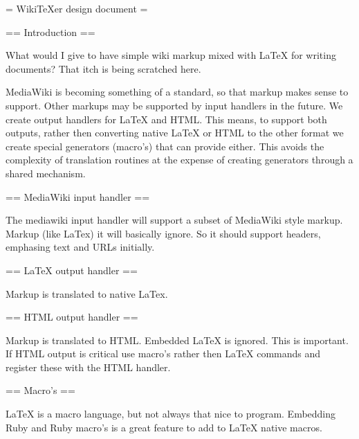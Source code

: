 = WikiTeXer design document =

== Introduction ==

What would I give to have simple wiki markup mixed with LaTeX for
writing documents? That itch is being scratched here.

MediaWiki is becoming something of a standard, so that markup makes
sense to support. Other markups may be supported by input handlers in
the future. We create output handlers for LaTeX and HTML. This means,
to support both outputs, rather then converting native LaTeX or HTML
to the other format we create special generators (macro's) that can
provide either. This avoids the complexity of translation routines at the
expense of creating generators through a shared mechanism.


== MediaWiki input handler ==

The mediawiki input handler will support a subset of MediaWiki style 
markup. Markup (like LaTex) it will basically ignore. So it should
support headers, emphasing text and URLs initially.


== LaTeX output handler ==

Markup is translated to native LaTex.


== HTML output handler ==

Markup is translated to HTML. Embedded LaTeX is ignored. This is
important. If HTML output is critical use macro's rather then LaTeX
commands and register these with the HTML handler.


== Macro's ==

LaTeX is a macro language, but not always that nice to program.
Embedding Ruby and Ruby macro's is a great feature to add to LaTeX
native macros.
